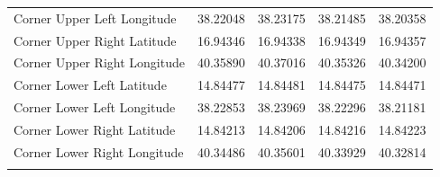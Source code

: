 \documentclass[sn-mathphys-num]{sn-jnl}%
\theoremstyle{thmstyleone}%
\theoremstyle{thmstyletwo}%
\theoremstyle{thmstylethree}%
\begin{document}
\begin{table}[h]
\begin{tabular}{@{}|l|l|l|l|l|@{}}
        Corner Upper Left Longitude & 38.22048 & 38.23175 & 38.21485 & 38.20358\\
        Corner Upper Right Latitude & 16.94346 & 16.94338 & 16.94349 & 16.94357\\
        Corner Upper Right Longitude & 40.35890 & 40.37016 & 40.35326 & 40.34200\\
        Corner Lower Left Latitude & 14.84477 & 14.84481 & 14.84475 & 14.84471\\
        Corner Lower Left Longitude & 38.22853 & 38.23969 & 38.22296 & 38.21181\\
        Corner Lower Right Latitude & 14.84213 & 14.84206 & 14.84216 & 14.84223\\
        Corner Lower Right Longitude & 40.34486 & 40.35601 & 40.33929 & 40.32814\\
        \botrule
    \end{tabular}
\end{table}
\end{document}

